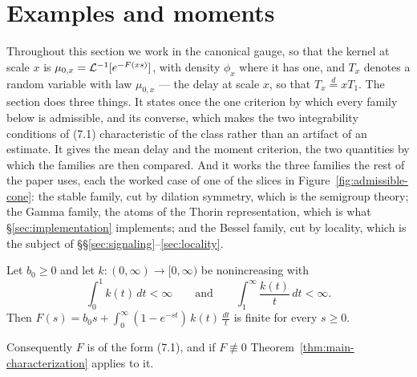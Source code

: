 
\section{Examples and moments}\label{sec:examples}

Throughout this section we work in the canonical gauge, so that the kernel at scale $x$
is $\mu_{0,x} = \mathcal{L}^{-1}[e^{-F(x s)}]$, with density $\phi_x$ where it has one, and $T_x$
denotes a random variable with law $\mu_{0,x}$ --- the delay at scale $x$, so that
$T_x \stackrel{d}{=} xT_1$. The section does three things. It states once the one criterion by
which every family below is admissible, and its converse, which makes the two integrability
conditions of (7.1) characteristic of the class rather than an artifact of an estimate. It
gives the mean delay and the moment criterion, the two quantities by which the families are
then compared. And it works the three families the rest of the paper uses, each the worked
case of one of the slices in Figure~\ref{fig:admissible-cone}: the stable family, cut by
dilation symmetry, which is the semigroup theory; the Gamma family, the atoms of the Thorin
representation, which is what \S\ref{sec:implementation} implements; and the Bessel family,
cut by locality, which is the subject of \S\S\ref{sec:signaling}--\ref{sec:locality}.

\begin{proposition}\label{prop:admissibility-criterion}
Let $b_0 \ge 0$ and let $k : (0,\infty) \to [0,\infty)$ be nonincreasing with
\[
  \int_0^1 k(t)\,dt < \infty
  \qquad\text{and}\qquad
  \int_1^\infty \frac{k(t)}{t}\,dt < \infty .
\]
Then $F(s) = b_0 s + \int_0^\infty (1 - e^{-st})\,k(t)\,\frac{dt}{t}$ is finite for every
$s \ge 0$.

Consequently $F$ is of the form (7.1), and if $F \not\equiv 0$ Theorem~\ref{thm:main-characterization}
applies to it.
\end{proposition}

